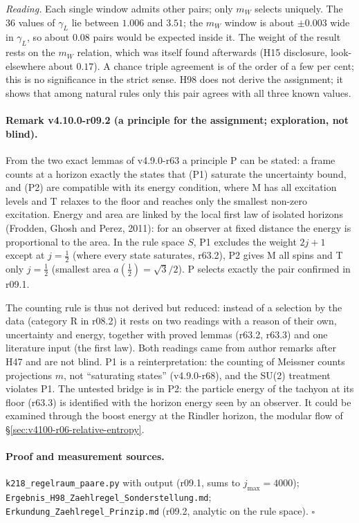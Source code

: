 \emph{Reading.}  Each single window admits other pairs; only \(m_W\) selects uniquely.  The \(36\) values of \(\gamma_L\) lie between \(1.006\) and \(3.51\); the \(m_W\)
window is about \(\pm0.003\) wide in \(\gamma_L\), so about \(0.08\) pairs would be expected inside it.  The weight of the result rests on the \(m_W\) relation,
which was itself found afterwards (H15 disclosure, look-elsewhere about \(0.17\)).  A chance triple agreement is of the order of a few per cent; this
is no significance in the strict sense.  H98 does not derive the assignment; it shows that among natural rules only this pair agrees with all three
known values.

\paragraph{Remark v4.10.0-r09.2 (a principle for the assignment; exploration, not blind).}
From the two exact lemmas of v4.9.0-r63 a principle P can be stated: a frame counts at a horizon exactly the states that
(P1) saturate the uncertainty bound, and (P2) are compatible with its energy condition, where M has all excitation levels and T relaxes to the floor and
reaches only the smallest non-zero excitation.  Energy and area are linked by the local first law of isolated horizons (Frodden, Ghosh and Perez,
2011): for an observer at fixed distance the energy is proportional to the area.  In the rule space \(S\), P1 excludes the weight \(2j+1\) except at
\(j=\tfrac12\) (where every state saturates, r63.2), P2 gives M all spins and T only \(j=\tfrac12\) (smallest area \(a(\tfrac12)=\sqrt3/2\)).  P selects exactly the
pair confirmed in r09.1.

The counting rule is thus not derived but reduced: instead of a selection by the data (category R in r08.2) it rests on two readings with a reason of
their own, uncertainty and energy, together with proved lemmas (r63.2, r63.3) and one literature input (the first law).  Both readings came from author
remarks after H47 and are not blind.  P1 is a reinterpretation: the counting of Meissner counts projections \(m\), not ``saturating states''
(v4.9.0-r68), and the SU(2) treatment violates P1.  The untested bridge is in P2: the particle energy of the tachyon at its floor (r63.3) is identified
with the horizon energy seen by an observer.  It could be examined through the boost energy at the Rindler horizon, the modular flow of
\S\ref{sec:v4100-r06-relative-entropy}.

\paragraph{Proof and measurement sources.}
\texttt{k218\_\allowbreak regelraum\_\allowbreak paare.py} with output (r09.1, sums to \(j_{\max}=4000\)); \texttt{Ergebnis\_\allowbreak H98\_\allowbreak Zaehlregel\_\allowbreak Sonderstellung.md};
\texttt{Erkundung\_\allowbreak Zaehlregel\_\allowbreak Prinzip.md} (r09.2, analytic on the rule space).  \(\square\)

